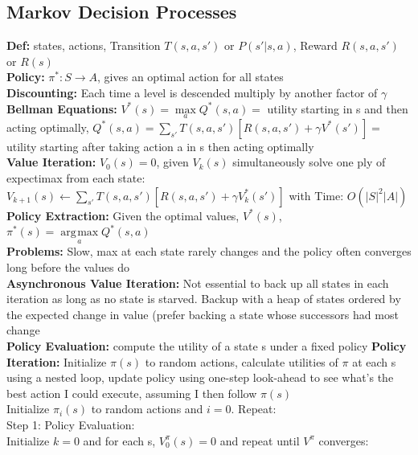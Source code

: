 \documentclass[10pt, a4paper]{article}
\DeclareMathOperator*{\argmax}{\arg\!\max}
\begin{document}
\begin{multicols*}{1}
        \section*{Markov Decision Processes}
            \textbf{Def:} states, actions, Transition $T(s, a, s')$ or $P(s' | s, a)$, Reward $R(s, a, s')$ or $R(s)$\\
            \textbf{Policy:} $\pi^{*}: S \to A$, gives an optimal action for all states\\
            \textbf{Discounting:} Each time a level is descended multiply by another factor of $\gamma$\\
            \textbf{Bellman Equations:} $V^*(s) = \max\limits_{a} Q^*(s, a) = $ utility starting in s and then acting optimally, $Q^*(s, a) = \sum_{s'} T(s, a, s') [R(s, a, s') + \gamma V^*(s')] = $ utility starting after taking action a in s then acting optimally\\
            \textbf{Value Iteration:} $V_0(s) = 0$, given $V_k(s)$ simultaneously solve one ply of expectimax from each state: $V_{k + 1}(s) \gets \sum_{s'} T(s, a, s') [R(s, a, s') + \gamma V_k^*(s')]$ with Time: $O(|S|^2|A|)$\\
            \textbf{Policy Extraction:} Given the optimal values, $V^*(s)$, $\pi^*(s) = \argmax\limits_{a} Q^*(s, a)$\\
            \textbf{Problems:} Slow, max at each state rarely changes and the policy often converges long before the values do\\
            \textbf{Asynchronous Value Iteration:} Not essential to back up all states in each iteration as long as no state is starved. Backup with a heap of states ordered by the expected change in value (prefer backing a state whose successors had most change\\
            \textbf{Policy Evaluation:} compute the utility of a state s under a fixed policy
            \textbf{Policy Iteration:} Initialize $\pi(s)$ to random actions, calculate utilities of $\pi$ at each s using a nested loop, update policy using one-step look-ahead to see what's the best action I could execute, assuming I then follow $\pi(s)$\\
            \hspace*{5 mm}Initialize $\pi_i(s)$ to random actions and $i = 0$. Repeat:\\
            \hspace*{10 mm}Step 1: Policy Evaluation:\\
            \hspace*{15 mm}Initialize $k = 0$ and for each s, $V_0^\pi(s) = 0$ and repeat until $V^\pi$ converges:\\

\end{multicols*}
\end{document}
